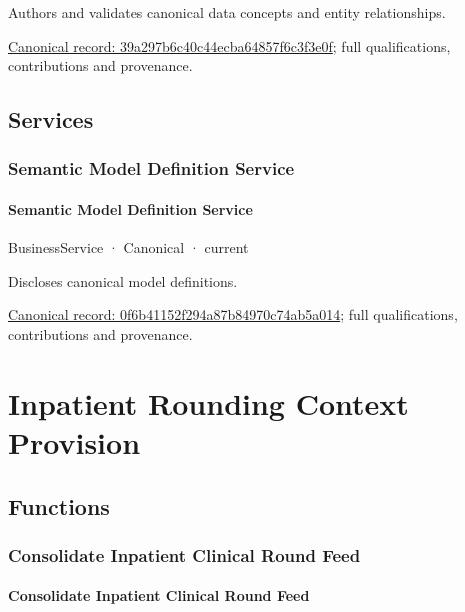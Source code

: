 Authors and validates canonical data concepts and entity relationships.


{\footnotesize \href{../../../../continuum/business/business-function/39a297b6c40c44ecba64857f6c3f3e0f.md}{Canonical record: 39a297b6c40c44ecba64857f6c3f3e0f}; full qualifications, contributions and provenance.}\par
\subsection{Services}

\subsubsection{Semantic Model Definition Service}

\paragraph{Semantic Model Definition Service}

\label{element:0f6b41152f294a87b84970c74ab5a014}
{\small BusinessService · Canonical · current}\par

Discloses canonical model definitions.


{\footnotesize \href{../../../../continuum/business/business-service/0f6b41152f294a87b84970c74ab5a014.md}{Canonical record: 0f6b41152f294a87b84970c74ab5a014}; full qualifications, contributions and provenance.}\par
\section{Inpatient Rounding Context Provision}

\subsection{Functions}

\subsubsection{Consolidate Inpatient Clinical Round Feed}

\paragraph{Consolidate Inpatient Clinical Round Feed}

